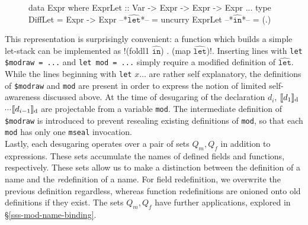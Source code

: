 \documentclass{llncs}
\newcommand{\diffhat}[1]{\ensuremath{\widehat{\texttt{#1}}}}
\newcommand{\translate}[2]{\ensuremath{\llbracket\texttt{#2}\rrbracket_{\textnormal{#1}}}}
\begin{document}
\begin{figure}[h]
\begin{hscode}
data Expr where
	ExprLet :: Var -> Expr -> Expr -> Expr
	...
type DiffLet = Expr -> Expr
--*\diffhat{let}*-- = uncurry ExprLet
--*\diffhat{in}*-- = (.)
\end{hscode}
\end{figure}

This representation is surprisingly convenient: a function which builds a simple let-stack can be implemented as \hsil!(foldl1 $\diffhat{in}$) . (map $\diffhat{let}$)!. Inserting lines with \texttt{let \$modraw = ...} and \texttt{let mod = ...} simply require a modified definition of \diffhat{let}.\\
\indent While the lines beginning with \texttt{let} $x \ldots$ are rather self explanatory, the definitions of \texttt{\$modraw} and \texttt{mod} are present in order to express the notion of limited self-awareness discussed above. At the time of desugaring of the declaration $d_i$, \translate{d}{$d_1$}$\cdots$\translate{d}{$d_{i-1}$} are projectable from a variable \texttt{mod}. The intermediate definition of \texttt{\$modraw} is introduced to prevent resealing existing definitions of \texttt{mod}, so that each \texttt{mod} has only one \texttt{mseal} invocation.\\
\indent Lastly, each desugaring operates over a pair of sets $Q_m, Q_f$ in addition to expressions. These sets accumulate the names of defined fields and functions, respectively. These sets allow us to make a distinction between the definition of a name and the \emph{re}definition of a name. For field redefinition, we overwrite the previous definition regardless, whereas function redefinitions are onioned onto old definitions if they exist. The sets $Q_m, Q_f$ have further applications, explored in \S \ref{sss-mod-name-binding}.
\end{document}
